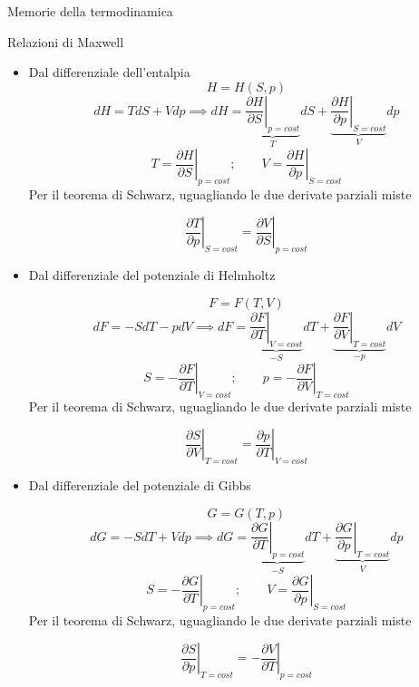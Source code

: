 \documentclass[a4paper,11pt]{report}
\begin{document}
\begin{chapter}{Memorie della termodinamica}
\begin{section}{Relazioni di Maxwell}
\begin{itemize}
		\item Dal differenziale dell'entalpia
		$$
		H=H(S,p)
		$$
		$$
		dH = TdS + Vdp \implies dH =\underset{T}{ \underbrace{\left.\dfrac{\partial H}{\partial S}\right|_{p=cost}}}dS +  \underset{V}{\underbrace{\left.\dfrac{\partial H}{\partial p}\right|_{S=cost}}}dp
		$$
		$$
		T= \left.\dfrac{\partial H}{\partial S}\right|_{p=cost}; \qquad V= \left.\dfrac{\partial H}{\partial p}\right|_{S=cost}
		$$
		Per il teorema di Schwarz, uguagliando le due derivate parziali miste

		
		\begin{equation}
		\left.\dfrac{\partial T}{\partial p}\right|_{S=cost} = \left.\dfrac{\partial V}{\partial S}\right|_{p=cost}
		\end{equation}
		
		\item Dal differenziale del potenziale di Helmholtz
		
		$$
		F=F(T,V)
		$$
		$$
		dF = - SdT - pdV \implies dF =\underset{-S}{ \underbrace{\left.\dfrac{\partial F}{\partial T}\right|_{V=cost}}}dT +  \underset{-p}{\underbrace{\left.\dfrac{\partial F}{\partial V}\right|_{T=cost}}}dV
		$$
		$$
		S = -\left.\dfrac{\partial F}{\partial T}\right|_{V=cost}; 
		\qquad
		p = - \left.\dfrac{\partial F}{\partial V}\right|_{T=cost}
		$$
		Per il teorema di Schwarz, uguagliando le due derivate parziali miste
		
		\begin{equation}
		\left.\dfrac{\partial S}{\partial V}\right|_{T=cost} = \left.\dfrac{\partial p}{\partial T}\right|_{V=cost}
		\end{equation}
		
		\item Dal differenziale del potenziale di Gibbs
		
		$$
		G=G(T,p)
		$$
		$$
		dG = - SdT + Vdp \implies dG =\underset{-S}{ \underbrace{\left.\dfrac{\partial G}{\partial T}\right|_{p=cost}}}dT +  \underset{V}{\underbrace{\left.\dfrac{\partial G}{\partial p}\right|_{T=cost}}}dp
		$$
		$$
		S= -\left.\dfrac{\partial G}{\partial T}\right|_{p=cost}; 
		\qquad
		V= \left.\dfrac{\partial G}{\partial p}\right|_{S=cost}
		$$
		Per il teorema di Schwarz, uguagliando le due derivate parziali miste
		
		\begin{equation}
		\left.\dfrac{\partial S}{\partial p}\right|_{T=cost} = - \left.\dfrac{\partial V}{\partial T}\right|_{p=cost}
		\end{equation}
		

\end{itemize}
\end{section}
\end{chapter}
\end{document}
